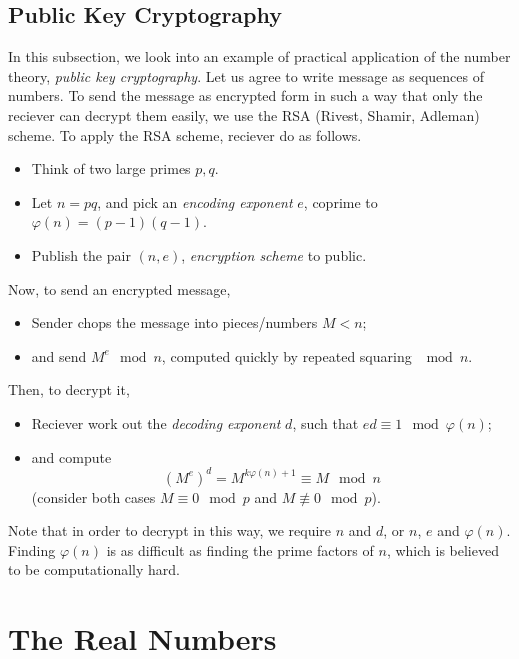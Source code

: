 \documentclass[10pt, a4paper, twoside]{report}
\begin{document}
\subsection{Public Key Cryptography}
In this subsection, we look into an example of practical application of the number theory, \emph{public key cryptography}. Let us agree to write message as sequences of numbers. To send the message as encrypted form in such a way that only the reciever can decrypt them easily, we use the RSA (Rivest, Shamir, Adleman) scheme. To apply the RSA scheme, reciever do as follows.
\begin{itemize}
    \item Think of two large primes \(p,q\).
    \item Let \(n=pq\), and pick an \emph{encoding exponent} \(e\), coprime to \(\varphi(n)=(p-1)(q-1)\).
    \item Publish the pair \((n,e)\), \emph{encryption scheme} to public.
\end{itemize}
Now, to send an encrypted message,
\begin{itemize}
    \item Sender chops the message into pieces/numbers \(M<n\);
    \item and send \(M^e\mod n\), computed quickly by repeated squaring \(\mod n\).
\end{itemize}
Then, to decrypt it,
\begin{itemize}
    \item Reciever work out the \emph{decoding exponent} \(d\), such that \(ed\equiv 1\mod \varphi(n)\);
    \item and compute
    \[(M^e)^d=M^{k\varphi(n)+1}\equiv M\mod n\]
    (consider both cases \(M\equiv 0\mod p\) and \(M\nequiv 0\mod p\)).
\end{itemize}
Note that in order to decrypt in this way, we require \(n\) and \(d\), or \(n\), \(e\) and \(\varphi(n)\). Finding \(\varphi(n)\) is as difficult as finding the prime factors of \(n\), which is believed to be computationally hard.
\section{The Real Numbers}
\end{document}
